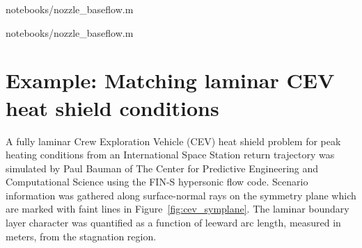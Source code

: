 \documentclass[letterpaper,11pt,nointlimits,reqno]{amsart}
\begin{document}

                {notebooks/nozzle_baseflow.m}


                {notebooks/nozzle_baseflow.m}

\clearpage

\section{Example: Matching laminar CEV heat shield conditions}

A fully laminar Crew Exploration Vehicle (CEV) heat shield problem for peak
heating conditions from an International Space Station return trajectory was
simulated by Paul Bauman of The Center for Predictive Engineering and
Computational Science using the FIN-S hypersonic flow
code\citep{KirkModeling2013}.  Scenario information was gathered along
surface-normal rays on the symmetry plane which are marked with faint lines in
Figure~\ref{fig:cev_symplane}.  The laminar boundary layer character was
quantified as a function of leeward arc length, measured in meters, from the
stagnation region.
\end{document}
